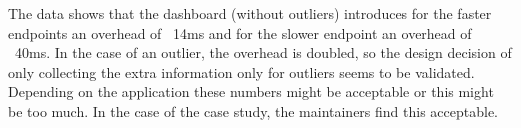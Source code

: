 	The data shows that the dashboard (without outliers) introduces for the faster endpoints an overhead of ~14ms and for the slower endpoint an overhead of ~40ms. 
	In the case of an outlier, the overhead is doubled, so the design decision of only collecting the extra information only for outliers seems to be validated. 
	Depending on the application these numbers might be acceptable or this might be too much. In the case of the \zee case study, the maintainers find this acceptable. 



  